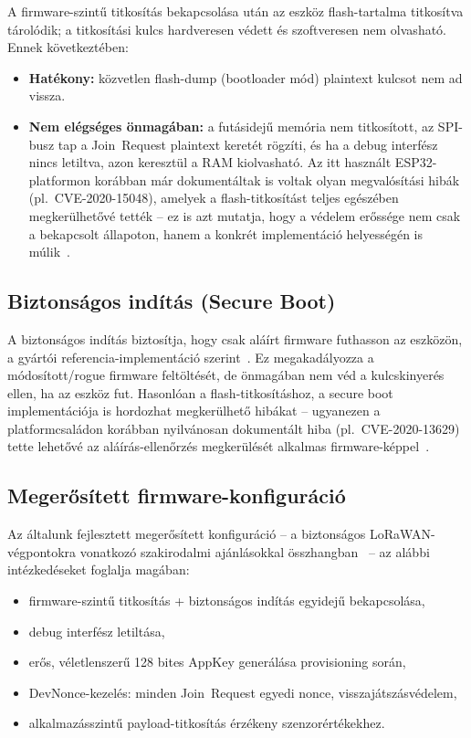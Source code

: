 \documentclass[12pt,a4paper]{article}
\begin{document}
A firmware-szintű titkosítás bekapcsolása után az eszköz flash-tartalma
titkosítva tárolódik; a titkosítási kulcs hardveresen védett és szoftveresen
nem olvasható. Ennek következtében:
\begin{itemize}
    \item \textbf{Hatékony:} közvetlen flash-dump (bootloader mód)
    plaintext kulcsot nem ad vissza.
    \item \textbf{Nem elégséges önmagában:} a futásidejű memória nem titkosított,
    az SPI-busz tap a Join~Request plaintext keretét rögzíti,
    és ha a debug interfész nincs letiltva, azon keresztül a RAM kiolvasható.
    Az itt használt ESP32-platformon korábban már dokumentáltak is voltak
    olyan megvalósítási hibák (pl.\ CVE-2020-15048), amelyek a flash-titkosítást
    teljes egészében megkerülhetővé tették -- ez is azt mutatja, hogy a
    védelem erőssége nem csak a bekapcsolt állapoton, hanem a konkrét
    implementáció helyességén is múlik~\cite{BV2020}.
\end{itemize}

\subsection{Biztonságos indítás (Secure Boot)}

A biztonságos indítás biztosítja, hogy csak aláírt firmware futhasson az eszközön,
a gyártói referencia-implementáció szerint~\cite{secure2026}.
Ez megakadályozza a módosított/rogue firmware feltöltését, de önmagában nem
véd a kulcskinyerés ellen, ha az eszköz fut. Hasonlóan a flash-titkosításhoz,
a secure boot implementációja is hordozhat megkerülhető hibákat -- ugyanezen
a platformcsaládon korábban nyilvánosan dokumentált hiba (pl.\
CVE-2020-13629) tette lehetővé az aláírás-ellenőrzés megkerülését
alkalmas firmware-képpel~\cite{BV2020a}.

\subsection{Megerősített firmware-konfiguráció}

Az általunk fejlesztett megerősített konfiguráció -- a biztonságos
LoRaWAN-végpontokra vonatkozó szakirodalmi ajánlásokkal
összhangban~\cite{oniga2017} -- az alábbi
intézkedéseket foglalja magában:
\begin{itemize}
    \item firmware-szintű titkosítás + biztonságos indítás egyidejű bekapcsolása,
    \item debug interfész letiltása,
    \item erős, véletlenszerű 128 bites AppKey generálása provisioning során,
    \item DevNonce-kezelés: minden Join~Request egyedi nonce, visszajátszásvédelem,
    \item alkalmazásszintű payload-titkosítás érzékeny szenzorértékekhez.
\end{itemize}
\end{document}
